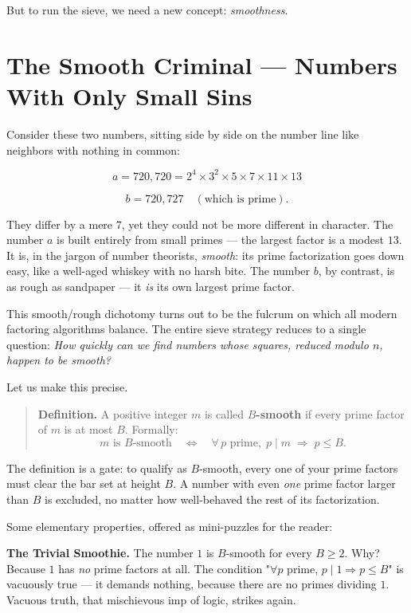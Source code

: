 \documentclass[11pt,twoside,openright]{book}
\theoremstyle{definition}
\theoremstyle{remark}
\begin{document}
But to run the sieve, we need a new concept: \textit{smoothness}.


\section{The Smooth Criminal --- Numbers With Only Small Sins}

Consider these two numbers, sitting side by side on the number line like neighbors with nothing in common:

\[a = 720{,}720 = 2^4 \times 3^2 \times 5 \times 7 \times 11 \times 13\]

\[b = 720{,}727 \quad (\text{which is prime}).\]

They differ by a mere $7$, yet they could not be more different in character. The number $a$ is built entirely from small primes --- the largest factor is a modest $13$. It is, in the jargon of number theorists, \textit{smooth}: its prime factorization goes down easy, like a well-aged whiskey with no harsh bite. The number $b$, by contrast, is as rough as sandpaper --- it \textit{is} its own largest prime factor.

This smooth/rough dichotomy turns out to be the fulcrum on which all modern factoring algorithms balance. The entire sieve strategy reduces to a single question: \textit{How quickly can we find numbers whose squares, reduced modulo $n$, happen to be smooth?}

Let us make this precise.

\begin{quote}
\textbf{Definition.} A positive integer $m$ is called \textbf{$B$-smooth} if every prime factor of $m$ is at most $B$. Formally:
$$m \text{ is } B\text{-smooth} \quad\Longleftrightarrow\quad \forall\, p \text{ prime},\; p \mid m \;\Rightarrow\; p \leq B.$$
\end{quote}
The definition is a gate: to qualify as $B$-smooth, every one of your prime factors must clear the bar set at height $B$. A number with even \textit{one} prime factor larger than $B$ is excluded, no matter how well-behaved the rest of its factorization.

Some elementary properties, offered as mini-puzzles for the reader:

\textbf{The Trivial Smoothie.} The number $1$ is $B$-smooth for every $B \geq 2$. Why? Because $1$ has \textit{no} prime factors at all. The condition "$\forall p$ prime, $p \mid 1 \Rightarrow p \leq B$" is vacuously true --- it demands nothing, because there are no primes dividing $1$. Vacuous truth, that mischievous imp of logic, strikes again.
\end{document}
